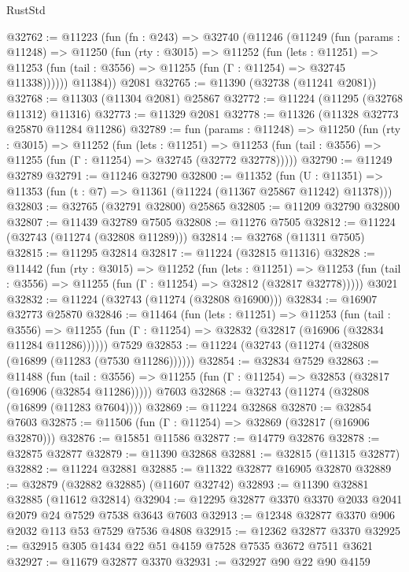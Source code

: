 \begin{lexlean}{RustStd}
\begin{coremodule}
@32762 := @11223
    (fun (fn : @243) =>
    @32740
      (@11246
        (@11249
          (fun (params : @11248) =>
          @11250
            (fun (rty : @3015) =>
            @11252
              (fun (lets : @11251) =>
              @11253 (fun (tail : @3556) => @11255 (fun (Γ : @11254) => @32745 @11338))))))
        @11384))
    @2081
@32765 := @11390 (@32738 (@11241 @2081))
@32768 := @11303 (@11304 @2081) @25867
@32772 := @11224 (@11295 (@32768 @11312) @11316)
@32773 := @11329 @2081
@32778 := @11326 (@11328 @32773 @25870 @11284 @11286)
@32789 := fun (params : @11248) =>
  @11250
    (fun (rty : @3015) =>
    @11252
      (fun (lets : @11251) =>
      @11253 (fun (tail : @3556) => @11255 (fun (Γ : @11254) => @32745 (@32772 @32778)))))
@32790 := @11249 @32789
@32791 := @11246 @32790
@32800 := @11352
    (fun (U : @11351) => @11353 (fun (t : @7) => @11361 (@11224 (@11367 @25867 @11242) @11378)))
@32803 := @32765 (@32791 @32800) @25865
@32805 := @11209 @32790 @32800
@32807 := @11439 @32789 @7505
@32808 := @11276 @7505
@32812 := @11224 (@32743 (@11274 (@32808 @11289)))
@32814 := @32768 (@11311 @7505)
@32815 := @11295 @32814
@32817 := @11224 (@32815 @11316)
@32828 := @11442
    (fun (rty : @3015) =>
    @11252
      (fun (lets : @11251) =>
      @11253 (fun (tail : @3556) => @11255 (fun (Γ : @11254) => @32812 (@32817 @32778)))))
    @3021
@32832 := @11224 (@32743 (@11274 (@32808 @16900)))
@32834 := @16907 @32773 @25870
@32846 := @11464
    (fun (lets : @11251) =>
    @11253
      (fun (tail : @3556) =>
      @11255 (fun (Γ : @11254) => @32832 (@32817 (@16906 (@32834 @11284 @11286))))))
    @7529
@32853 := @11224 (@32743 (@11274 (@32808 (@16899 (@11283 (@7530 @11286))))))
@32854 := @32834 @7529
@32863 := @11488
    (fun (tail : @3556) => @11255 (fun (Γ : @11254) => @32853 (@32817 (@16906 (@32854 @11286)))))
    @7603
@32868 := @32743 (@11274 (@32808 (@16899 (@11283 @7604))))
@32869 := @11224 @32868
@32870 := @32854 @7603
@32875 := @11506 (fun (Γ : @11254) => @32869 (@32817 (@16906 @32870)))
@32876 := @15851 @11586
@32877 := @14779 @32876
@32878 := @32875 @32877
@32879 := @11390 @32868
@32881 := @32815 (@11315 @32877)
@32882 := @11224 @32881
@32885 := @11322 @32877 @16905 @32870
@32889 := @32879 (@32882 @32885) (@11607 @32742)
@32893 := @11390 @32881 @32885 (@11612 @32814)
@32904 := @12295 @32877 @3370 @3370 @2033 @2041 @2079 @24 @7529 @7538 @3643 @7603
@32913 := @12348 @32877 @3370 @906 @2032 @113 @53 @7529 @7536 @4808
@32915 := @12362 @32877 @3370
@32925 := @32915 @305 @1434 @22 @51 @4159 @7528 @7535 @3672 @7511 @3621
@32927 := @11679 @32877 @3370
@32931 := @32927 @90 @22 @90 @4159

\end{coremodule}
\end{lexlean}
